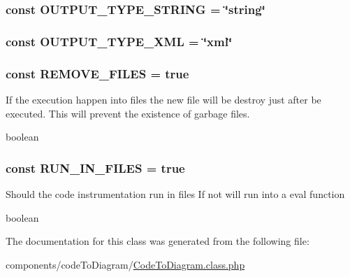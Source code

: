 \hypertarget{class_code_to_diagram_7b2a676828728d3c85df18eebb42854f}{
\subsubsection[{OUTPUT\_\-TYPE\_\-STRING}]{\setlength{\rightskip}{0pt plus 5cm}const {\bf OUTPUT\_\-TYPE\_\-STRING} = \char`\"{}string\char`\"{}}}
\label{class_code_to_diagram_7b2a676828728d3c85df18eebb42854f}


\hypertarget{class_code_to_diagram_04b49bbd2c3e914e22a80db89997dd67}{
\subsubsection[{OUTPUT\_\-TYPE\_\-XML}]{\setlength{\rightskip}{0pt plus 5cm}const {\bf OUTPUT\_\-TYPE\_\-XML} = \char`\"{}xml\char`\"{}}}
\label{class_code_to_diagram_04b49bbd2c3e914e22a80db89997dd67}


\hypertarget{class_code_to_diagram_2832af3e5aa01936d5bcec53d500e7ab}{
\subsubsection[{REMOVE\_\-FILES}]{\setlength{\rightskip}{0pt plus 5cm}const {\bf REMOVE\_\-FILES} = true}}
\label{class_code_to_diagram_2832af3e5aa01936d5bcec53d500e7ab}


If the execution happen into files the new file will be destroy just after be executed. This will prevent the existence of garbage files.

boolean \hypertarget{class_code_to_diagram_2cec53b0c2258fcbb3ecefc5d8788fb0}{
\subsubsection[{RUN\_\-IN\_\-FILES}]{\setlength{\rightskip}{0pt plus 5cm}const {\bf RUN\_\-IN\_\-FILES} = true}}
\label{class_code_to_diagram_2cec53b0c2258fcbb3ecefc5d8788fb0}


Should the code instrumentation run in files If not will run into a eval function

boolean 

The documentation for this class was generated from the following file:\begin{CompactItemize}
\item 
components/codeToDiagram/\hyperlink{_code_to_diagram_8class_8php}{CodeToDiagram.class.php}\end{CompactItemize}
